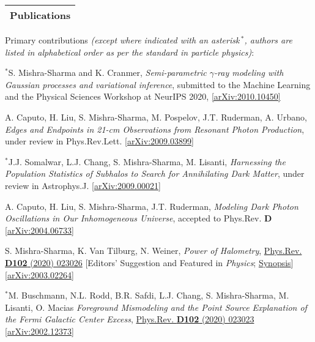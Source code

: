 \documentclass[11pt]{article}
\newenvironment{packed_enumerate}[1][]{
\begin{etaremune}[#1]
  \setlength{\itemsep}{3pt}
  \setlength{\parskip}{0pt}
  \setlength{\parsep}{0pt}}{\end{etaremune}
}
\begin{document}

\noindent
\begin{tabular*}{\textwidth}{l@{\extracolsep{\fill}}}
\large {\sc \Large{Publications}}\\
\hline
\end{tabular*}\vspace{3.5mm}
\noindent
Primary contributions \emph{(except where indicated with an asterisk\,$^*$, authors are listed in alphabetical order as per the standard in particle physics)}:

\begin{packed_enumerate}[start=24]
\item $^*$S. Mishra-Sharma and K. Cranmer, \emph{Semi-parametric $\gamma$-ray modeling with Gaussian processes and variational inference}, submitted to the Machine Learning and the Physical Sciences Workshop at NeurIPS 2020,  \href{https://arxiv.org/abs/2010.10450}{[arXiv:2010.10450]}

\item A. Caputo, H. Liu, S. Mishra-Sharma, M. Pospelov, J.T. Ruderman, A. Urbano, \emph{Edges and Endpoints in 21-cm Observations from Resonant Photon Production}, under review in Phys.Rev.Lett. \href{https://arxiv.org/abs/2009.03899}{[arXiv:2009.03899]}

\item $^*$J.J. Somalwar, L.J. Chang, S. Mishra-Sharma, M. Lisanti, \emph{Harnessing the Population Statistics of Subhalos to Search for Annihilating Dark Matter}, under review in Astrophys.J. \href{https://arxiv.org/abs/2009.00021}{[arXiv:2009.00021]}

\item A. Caputo, H. Liu, S. Mishra-Sharma, J.T. Ruderman, \emph{Modeling Dark Photon Oscillations in Our Inhomogeneous Universe}, accepted to Phys.Rev. \textbf{D}  \href{https://arxiv.org/abs/2004.06733}{[arXiv:2004.06733]}

\item S. Mishra-Sharma, K. Van Tilburg, N. Weiner, \emph{Power of Halometry}, \href{https://journals.aps.org/prd/abstract/10.1103/PhysRevD.102.023026}{Phys.Rev. \textbf{D102} (2020) 023026} [Editors' Suggestion and Featured in \emph{Physics}; \href{https://physics.aps.org/articles/v13/s98}{Synopsis}]  \href{https://arxiv.org/abs/2003.02264}{[arXiv:2003.02264]}

\item $^*$M. Buschmann, N.L. Rodd, B.R. Safdi, L.J. Chang, S. Mishra-Sharma, M. Lisanti, O. Macias \emph{Foreground Mismodeling and the Point Source Explanation of the Fermi Galactic Center Excess},  \href{https://journals.aps.org/prd/abstract/10.1103/PhysRevD.102.023023}{Phys.Rev. \textbf{D102} (2020) 023023} \href{https://arxiv.org/abs/2002.12373}{[arXiv:2002.12373]} 


\end{packed_enumerate}
\end{document}

